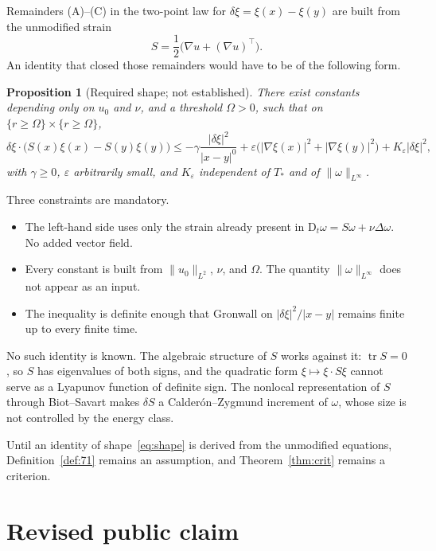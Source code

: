\documentclass[11pt,a4paper]{article}
\newtheorem{proposition}[theorem]{Proposition}
\theoremstyle{definition}
\theoremstyle{remark}
\newcommand{\abs}[1]{\lvert#1\rvert}
\newcommand{\norm}[1]{\lVert#1\rVert}
\newcommand{\grad}{\nabla}
\begin{document}
Remainders (A)--(C) in the two-point law for $\delta\xi=\xi(x)-\xi(y)$ are built from the unmodified strain
\[
S=\frac12\bigl(\grad u+(\grad u)^\top\bigr).
\]
An identity that closed those remainders would have to be of the following form.

\begin{proposition}[Required shape; not established]
\label{prop:shape}
There exist constants depending only on $u_0$ and $\nu$, and a threshold $\Omega>0$, such that on $\{r\ge\Omega\}\times\{r\ge\Omega\}$,
\begin{equation}
\label{eq:shape}
\delta\xi\cdot\bigl(S(x)\xi(x)-S(y)\xi(y)\bigr)
\le
-\gamma\frac{\abs{\delta\xi}^2}{\abs{x-y}^{0}}
+
\varepsilon\bigl(\abs{\grad\xi(x)}^2+\abs{\grad\xi(y)}^2\bigr)
+
K_{\varepsilon}\abs{\delta\xi}^2,
\end{equation}
with $\gamma\ge 0$, $\varepsilon$ arbitrarily small, and $K_{\varepsilon}$ independent of $T_*$ and of $\norm{\omega}_{L^\infty}$.
\end{proposition}

Three constraints are mandatory.

\begin{itemize}[leftmargin=1.6em]
\item The left-hand side uses only the strain already present in $\mathrm{D}_t\omega=S\omega+\nu\Delta\omega$. No added vector field.
\item Every constant is built from $\norm{u_0}_{L^2}$, $\nu$, and $\Omega$. The quantity $\norm{\omega}_{L^\infty}$ does not appear as an input.
\item The inequality is definite enough that Gronwall on $\abs{\delta\xi}^2/\abs{x-y}$ remains finite up to every finite time.
\end{itemize}

No such identity is known. The algebraic structure of $S$ works against it: $\operatorname{tr} S=0$, so $S$ has eigenvalues of both signs, and the quadratic form $\xi\mapsto\xi\cdot S\xi$ cannot serve as a Lyapunov function of definite sign. The nonlocal representation of $S$ through Biot--Savart makes $\delta S$ a Calder\'on--Zygmund increment of $\omega$, whose size is not controlled by the energy class.

Until an identity of shape~\eqref{eq:shape} is derived from the unmodified equations, Definition~\ref{def:71} remains an assumption, and Theorem~\ref{thm:crit} remains a criterion.

\section{Revised public claim}
\end{document}
